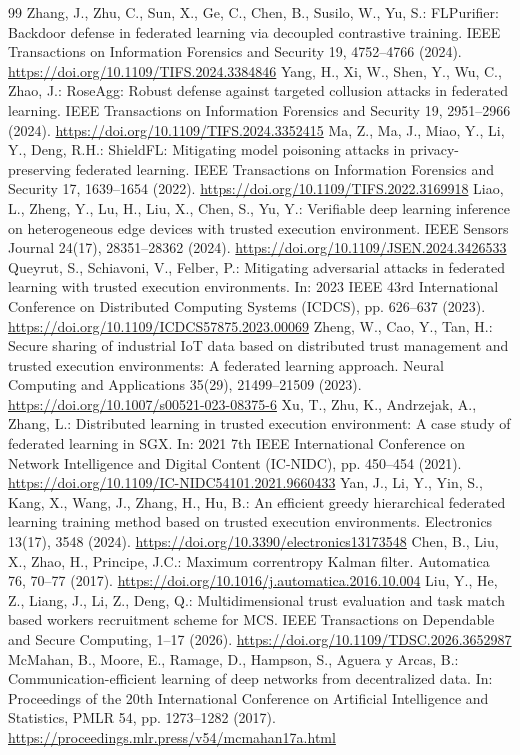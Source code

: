 \documentclass[11pt, a4paper, UTF8, fontset=fandol]{ctexart}
\begin{document}
\begin{thebibliography}{99}
     Zhang, J., Zhu, C., Sun, X., Ge, C., Chen, B., Susilo, W., Yu, S.: FLPurifier: Backdoor defense in federated learning via decoupled contrastive training. IEEE Transactions on Information Forensics and Security 19, 4752--4766 (2024). \url{https://doi.org/10.1109/TIFS.2024.3384846}
     Yang, H., Xi, W., Shen, Y., Wu, C., Zhao, J.: RoseAgg: Robust defense against targeted collusion attacks in federated learning. IEEE Transactions on Information Forensics and Security 19, 2951--2966 (2024). \url{https://doi.org/10.1109/TIFS.2024.3352415}
     Ma, Z., Ma, J., Miao, Y., Li, Y., Deng, R.H.: ShieldFL: Mitigating model poisoning attacks in privacy-preserving federated learning. IEEE Transactions on Information Forensics and Security 17, 1639--1654 (2022). \url{https://doi.org/10.1109/TIFS.2022.3169918}
     Liao, L., Zheng, Y., Lu, H., Liu, X., Chen, S., Yu, Y.: Verifiable deep learning inference on heterogeneous edge devices with trusted execution environment. IEEE Sensors Journal 24(17), 28351--28362 (2024). \url{https://doi.org/10.1109/JSEN.2024.3426533}
     Queyrut, S., Schiavoni, V., Felber, P.: Mitigating adversarial attacks in federated learning with trusted execution environments. In: 2023 IEEE 43rd International Conference on Distributed Computing Systems (ICDCS), pp. 626--637 (2023). \url{https://doi.org/10.1109/ICDCS57875.2023.00069}
     Zheng, W., Cao, Y., Tan, H.: Secure sharing of industrial IoT data based on distributed trust management and trusted execution environments: A federated learning approach. Neural Computing and Applications 35(29), 21499--21509 (2023). \url{https://doi.org/10.1007/s00521-023-08375-6}
     Xu, T., Zhu, K., Andrzejak, A., Zhang, L.: Distributed learning in trusted execution environment: A case study of federated learning in SGX. In: 2021 7th IEEE International Conference on Network Intelligence and Digital Content (IC-NIDC), pp. 450--454 (2021). \url{https://doi.org/10.1109/IC-NIDC54101.2021.9660433}
     Yan, J., Li, Y., Yin, S., Kang, X., Wang, J., Zhang, H., Hu, B.: An efficient greedy hierarchical federated learning training method based on trusted execution environments. Electronics 13(17), 3548 (2024). \url{https://doi.org/10.3390/electronics13173548}
     Chen, B., Liu, X., Zhao, H., Principe, J.C.: Maximum correntropy Kalman filter. Automatica 76, 70--77 (2017). \url{https://doi.org/10.1016/j.automatica.2016.10.004}
     Liu, Y., He, Z., Liang, J., Li, Z., Deng, Q.: Multidimensional trust evaluation and task match based workers recruitment scheme for MCS. IEEE Transactions on Dependable and Secure Computing, 1--17 (2026). \url{https://doi.org/10.1109/TDSC.2026.3652987}
     McMahan, B., Moore, E., Ramage, D., Hampson, S., Aguera y Arcas, B.: Communication-efficient learning of deep networks from decentralized data. In: Proceedings of the 20th International Conference on Artificial Intelligence and Statistics, PMLR 54, pp. 1273--1282 (2017). \url{https://proceedings.mlr.press/v54/mcmahan17a.html}
\end{thebibliography}
\end{document}
